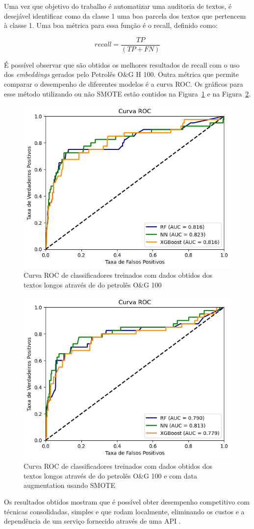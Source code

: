 \documentclass[conference]{IEEEtran}
\begin{document}
Uma vez que objetivo do trabalho é automatizar uma auditoria de textos, é desejável identificar como da classe 1 uma boa parcela dos textos que pertencem à classe 1. Uma boa métrica para essa função é o recall, definido como:


$$recall = \frac{TP}{(TP + FN)}$$



É possível observar que são obtidos os melhores resultados de recall com o uso dos \textit{embeddings} gerados pelo Petrolês O\&G H 100. Outra métrica que permite comparar o desempenho de diferentes modelos é a curva ROC. Os gráficos para esse método utilizando ou não SMOTE estão contidos na Figura~\ref{fig:petrolesh100} e na Figura~\ref{fig:petrolesh100-sm}.

  \begin{figure}[ht]
  \centering
  \includegraphics[width=.48\textwidth]{petrolesh100.png}
  \caption{Curva ROC de classificadores treinados com dados obtidos dos textos longos através de do petrolês O\&G 100}
  \label{fig:petrolesh100}
  \end{figure}

  \begin{figure}[ht]
  \centering
  \includegraphics[width=.48\textwidth]{petrolesh100-sm.png}
  \caption{Curva ROC de classificadores treinados com dados obtidos dos textos longos através de do petrolês O\&G 100 e com data augmentation usando SMOTE}
  \label{fig:petrolesh100-sm}
  \end{figure}

  Os resultados obtidos mostram que é possível obter desempenho competitivo com técnicas consolidadas, simples e que rodam localmente, eliminando os custos e a dependência de um serviço fornecido através de uma API \cite{neelakantan2022text}.
\end{document}
